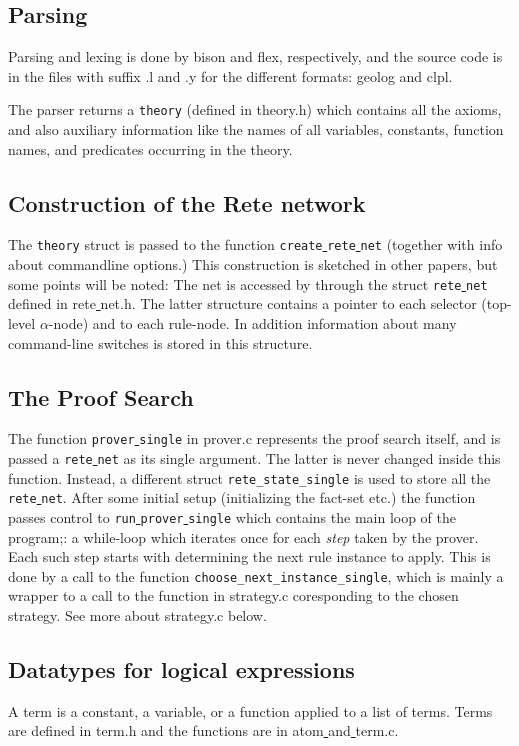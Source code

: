 \documentclass[a4paper]{article}
\begin{document}
\subsection{Parsing}
Parsing and lexing is done by bison and flex, respectively, and the source code is in the files with suffix .l and .y for the different formats: geolog and clpl. 

The parser returns a \verb|theory| (defined in theory.h) which contains all the axioms, and also auxiliary information like the names of all variables, constants, function names, and predicates occurring in the theory. 

\subsection{Construction of the Rete network}
The \verb|theory| struct is passed to the function \verb|create|\underline{ }\verb|rete|\underline{ }\verb|net| (together with info about commandline options.) This construction is sketched in other papers, but some points will be noted: The net is accessed by through the struct \verb|rete|\underline{ }\verb|net| defined in rete\underline{ }net.h. The latter structure contains a pointer to each selector (top-level $\alpha$-node) and to each rule-node. In addition information about many command-line switches is stored in this structure. 

\subsection{The Proof Search}
The function \verb|prover|\underline{ }\verb|single| in prover.c represents the proof search itself, and is passed a \verb|rete|\underline{ }\verb|net| as its single argument. The latter is never changed inside this function. Instead, a different struct \verb|rete_state_single| is used to store all the \verb|rete|\underline{ }\verb|net|. After some initial setup (initializing the fact-set etc.) the function passes control to  \verb|run|\underline{ }\verb|prover|\underline{ }\verb|single| which contains the main loop of the program;: a while-loop which iterates once for each \emph{step} taken by the prover. Each such step starts with determining the next rule instance to apply. This is done by a call to the function \verb|choose_next_instance_single|, which is mainly a wrapper to a call to the function in strategy.c coresponding to the chosen strategy. See more about strategy.c below.

\subsection{Datatypes for logical expressions}
A term is a constant, a variable, or a function applied to a list of terms. Terms are defined in term.h and the functions are in atom\underline{ }and\underline{ }term.c. 
\end{document}

